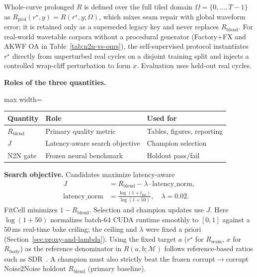 Whole-curve prolonged $R$ is defined over the full tiled domain $\Omega{=}\{0,\dots,T{-}1\}$ as $R_{\mathrm{prol}}(r^{\star},y)=R(r^{\star},y;\Omega)$, which mixes seam repair with global waveform error; it is retained only as a superseded legacy key and never replaces $R_{\mathrm{blend}}$.
For real-world wavetable corpora without a procedural generator (Factory+FX and AKWF OA in Table~\ref{tab:n2n-vs-ours}), the self-supervised protocol instantiates $r^{\star}$ directly from unperturbed real cycles on a disjoint training split and injects a controlled wrap-cliff perturbation to form $x$. Evaluation uses held-out real cycles.

\textbf{Roles of the three quantities.}
\begin{center}
\small
\begin{adjustbox}{max width=\columnwidth}
\begin{tabular}{@{}lll@{}}
\toprule
Quantity & Role & Used for \\
\midrule
$R_{\mathrm{blend}}$ & Primary quality metric & Tables, figures, reporting \\
$J$ & Latency-aware search objective & Champion selection \\
N2N gate & Frozen neural benchmark & Holdout pass/fail \\
\bottomrule
\end{tabular}
\end{adjustbox}
\end{center}

\textbf{Search objective.}
Candidates maximize latency-aware
\begin{equation}
\label{eq:outer-obj}
\begin{aligned}
J&=R_{\mathrm{blend}}-\lambda\cdot\mathrm{latency\_norm},\\
\mathrm{latency\_norm}
&=\frac{\log(1+t_{\mathrm{ms}})}{\log(1+50)},
\quad \lambda=0.02.
\end{aligned}
\end{equation}
FitCell minimizes $1-R_{\mathrm{blend}}$. Selection and champion updates use $J$.
Here $\log(1+50)$ normalizes batch-64 CUDA runtime smoothly to $[0,1]$ against a $50$\,ms real-time bake ceiling; the ceiling and $\lambda$ were fixed a priori (Section~\ref{sec:proxy-and-lambda}).
Using the fixed target $a$ ($r^{\star}$ for $R_{\mathrm{seam}}$, $x$ for $R_{\mathrm{body}}$) as the reference denominator in $R(a,b;\mathcal{M})$ follows reference-based ratios such as SDR~\citep{purwins2019}.
A champion must also strictly beat the frozen corrupt$\to$corrupt Noise2Noise holdout $R_{\mathrm{blend}}$ (primary baseline).

